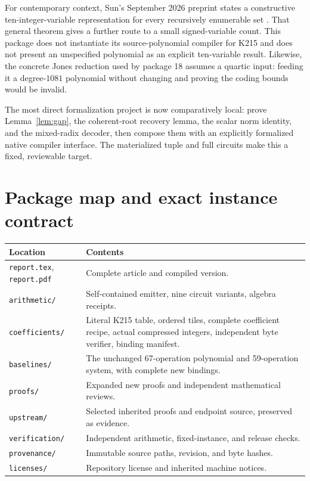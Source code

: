 \documentclass[11pt,a4paper]{article}
\theoremstyle{remark}\newtheorem{remark}[theorem]{Remark}
\begin{document}
For contemporary context, Sun's September 2026 preprint states a constructive
ten-integer-variable representation for every recursively enumerable set
\cite{sun2026}. That general theorem gives a further route to a small
signed-variable count. This package does not instantiate its source-polynomial
compiler for K215 and does not present an unspecified polynomial as an
explicit ten-variable result. Likewise, the concrete Jones reduction used
by package 18 assumes a quartic input: feeding it a degree-$1081$ polynomial
without changing and proving the coding bounds would be invalid.

The most direct formalization project is now comparatively local: prove
Lemma~\ref{lem:gap}, the coherent-root recovery lemma, the scalar norm
identity, and the mixed-radix decoder, then compose them with an explicitly
formalized native compiler interface. The materialized tuple and full
circuits make this a fixed, reviewable target.

\appendix
\section{Package map and exact instance contract}

\begin{center}\small
\begin{tabular}{@{}p{.30\linewidth}p{.62\linewidth}@{}}
\toprule
Location & Contents\\
\midrule
\texttt{report.tex}, \texttt{report.pdf} & Complete article and compiled version.\\
\texttt{arithmetic/} & Self-contained emitter, nine circuit variants, algebra receipts.\\
\texttt{coefficients/} & Literal K215 table, ordered tiles, complete coefficient recipe,
actual compressed integers, independent byte verifier, binding manifest.\\
\texttt{baselines/} & The unchanged 67-operation polynomial and 59-operation system,
with complete new bindings.\\
\texttt{proofs/} & Expanded new proofs and independent mathematical reviews.\\
\texttt{upstream/} & Selected inherited proofs and endpoint source, preserved as evidence.\\
\texttt{verification/} & Independent arithmetic, fixed-instance, and release checks.\\
\texttt{provenance/} & Immutable source paths, revision, and byte hashes.\\
\texttt{licenses/} & Repository license and inherited machine notices.\\
\bottomrule
\end{tabular}
\end{center}
\end{document}
